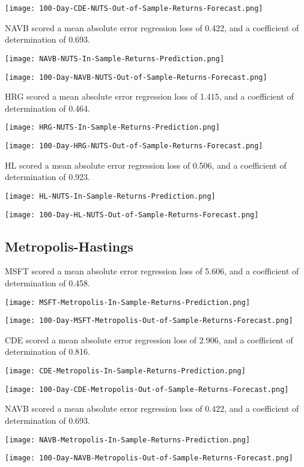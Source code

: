 \texttt{[image: 100-Day-CDE-NUTS-Out-of-Sample-Returns-Forecast.png]}

NAVB scored a mean absolute error regression loss of 0.422, and a coefficient of determination of 0.693.

\texttt{[image: NAVB-NUTS-In-Sample-Returns-Prediction.png]}

\texttt{[image: 100-Day-NAVB-NUTS-Out-of-Sample-Returns-Forecast.png]}

HRG scored a mean absolute error regression loss of 1.415, and a coefficient of determination of 0.464.

\texttt{[image: HRG-NUTS-In-Sample-Returns-Prediction.png]}

\texttt{[image: 100-Day-HRG-NUTS-Out-of-Sample-Returns-Forecast.png]}

HL scored a mean absolute error regression loss of 0.506, and a coefficient of determination of 0.923.

\texttt{[image: HL-NUTS-In-Sample-Returns-Prediction.png]}

\texttt{[image: 100-Day-HL-NUTS-Out-of-Sample-Returns-Forecast.png]}

\subsection{Metropolis-Hastings}
MSFT scored a mean absolute error regression loss of 5.606, and a coefficient of determination of 0.458.

\texttt{[image: MSFT-Metropolis-In-Sample-Returns-Prediction.png]}

\texttt{[image: 100-Day-MSFT-Metropolis-Out-of-Sample-Returns-Forecast.png]}

CDE scored a mean absolute error regression loss of 2.906, and a coefficient of determination of 0.816.

\texttt{[image: CDE-Metropolis-In-Sample-Returns-Prediction.png]}

\texttt{[image: 100-Day-CDE-Metropolis-Out-of-Sample-Returns-Forecast.png]}

NAVB scored a mean absolute error regression loss of 0.422, and a coefficient of determination of 0.693.

\texttt{[image: NAVB-Metropolis-In-Sample-Returns-Prediction.png]}

\texttt{[image: 100-Day-NAVB-Metropolis-Out-of-Sample-Returns-Forecast.png]}

